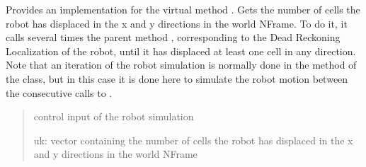 \documentclass[letterpaper,10pt,english]{sphinxmanual}
\begin{document}
\begin{fulllineitems}
\begin{fulllineitems}
\end{fulllineitems}


\begin{fulllineitems}
\label{\detokenize{GridLocalization:GL_3DOFDifferentialDrive.GL_3DOFDifferentialDrive.GetInput}}
\pysigstartsignatures
{}
\pysigstopsignatures
\sphinxAtStartPar
Provides an implementation for the virtual method .
Gets the number of cells the robot has displaced in the x and y directions in the world N\sphinxhyphen{}Frame. To do it, it
calls several times the parent method , corresponding to the Dead Reckoning Localization
of the robot, until it has displaced at least one cell in any direction.
Note that an iteration of the robot simulation  is normally done in the 
method of the  class, but in this case it is done here to simulate the robot motion
between the consecutive calls to .
\begin{quote}\begin{description}
\sphinxAtStartPar
{} \textendash{} control input of the robot simulation

\sphinxAtStartPar
uk: vector containing the number of cells the robot has displaced in the x and y directions in the world N\sphinxhyphen{}Frame

\end{description}\end{quote}

\end{fulllineitems}


\end{fulllineitems}



\begin{savenotes}\sphinxattablestart
\sphinxthistablewithglobalstyle
\sphinxthistablewithnovlinesstyle
\centering
\begin{tabulary}{\linewidth}[t]{}
\sphinxtoprule
\sphinxtableatstartofbodyhook\sphinxbottomrule
\end{tabulary}
\sphinxtableafterendhook\par
\sphinxattableend\end{savenotes}
\end{document}
